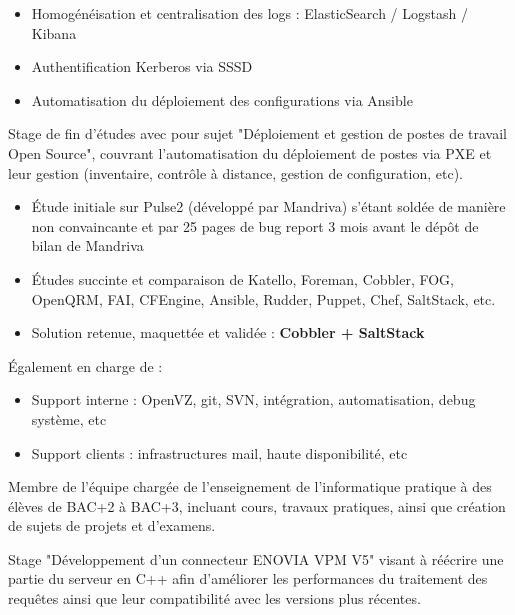 \documentclass[10pt,a4paper]{moderncv}
\begin{document}
{
  \begin{itemize}
    \item Homogénéisation et centralisation des logs : ElasticSearch / Logstash
      / Kibana
    \item Authentification Kerberos via SSSD
    \item Automatisation du déploiement des configurations via Ansible
  \end{itemize}
}

{Stage de fin d'études avec pour sujet "Déploiement et gestion de postes de
travail Open Source", couvrant l'automatisation du déploiement de postes via
PXE et leur gestion (inventaire, contrôle à distance, gestion de configuration,
etc).
\begin{itemize}
  \item \'{E}tude initiale sur Pulse2 (développé par Mandriva) s'étant soldée
    de manière non convaincante et par 25 pages de bug report 3 mois avant le
    dépôt de bilan de Mandriva
  \item \'{E}tudes succinte et comparaison de Katello, Foreman, Cobbler, FOG,
    OpenQRM, FAI, CFEngine, Ansible, Rudder, Puppet, Chef, SaltStack, etc.
  \item Solution retenue, maquettée et validée : \textbf{Cobbler + SaltStack}
\end{itemize}
\'{E}galement en charge de :
\begin{itemize}
  \item Support interne : OpenVZ, git, SVN, intégration, automatisation, debug
    système, etc
  \item Support clients : infrastructures mail, haute disponibilité, etc
\end{itemize}
}

{Membre de l'équipe chargée de l'enseignement de l'informatique pratique à des
élèves de BAC+2 à BAC+3, incluant cours, travaux pratiques, ainsi que création
de sujets de projets et d'examens.}

{Stage "Développement d'un connecteur ENOVIA VPM V5" visant à réécrire une
partie du serveur en C++ afin d'améliorer les performances du traitement des
requêtes ainsi que leur compatibilité avec les versions plus récentes.}
\end{document}
